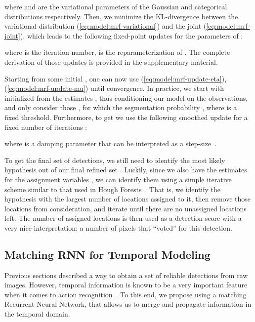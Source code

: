 \documentclass[10pt,twocolumn,letterpaper]{article}
\begin{document}
\vspace{-0.25cm}

where  and  are the variational
parameters of the Gaussian and categorical distributions respectively. Then,
we minimize the KL-divergence between the variational distribution
(\ref{eq:model:mrf-variational}) and the joint (\ref{eq:model:mrf-joint}), which
leads to the following fixed-point updates for the parameters of :


where  is the iteration number, 
 is the reparameterization of . The
complete derivation of those updates is provided in the supplementary material.

Starting from some initial , one can now use
(\ref{eq:model:mrf-update-eta}),
(\ref{eq:model:mrf-update-mu}) until convergence. In practice, we start with
 initialized from the estimates , thus conditioning our model
on the observations, and only consider those , for which the
segmentation probability , where  is a fixed threshold. 
Furthermore, to
get  we use the following smoothed update for a fixed number of
iterations :

where  is a damping parameter that can be interpreted as a
step-size~\cite{Baque2016}.

To get the final set of detections, we still need to identify the most likely
hypothesis out of our final refined set . Luckily, since we also have
the estimates  for the assignment variables , we can identify
them using a simple iterative scheme similar to that used in Hough
Forests~\cite{Barinova2012}. That is, we identify the hypothesis with the
largest number of locations assigned to it, then remove those
locations from consideration, and iterate until there are no unassigned
locations left. The number of assigned locations is then used as a detection
score with a very nice interpretation: a number of pixels that ``voted'' for
this detection. 


\subsection{Matching RNN for Temporal Modeling}
\vspace{-0.15cm}

Previous sections described a way to obtain a set of reliable detections
from raw images. However, temporal information is known to be a very important
feature when it comes to action recognition~\cite{Laptev2008, Wang2013}. To this
end, we propose using a matching Recurrent Neural Network, that allows us to 
merge and propagate information in the temporal domain.
\end{document}
